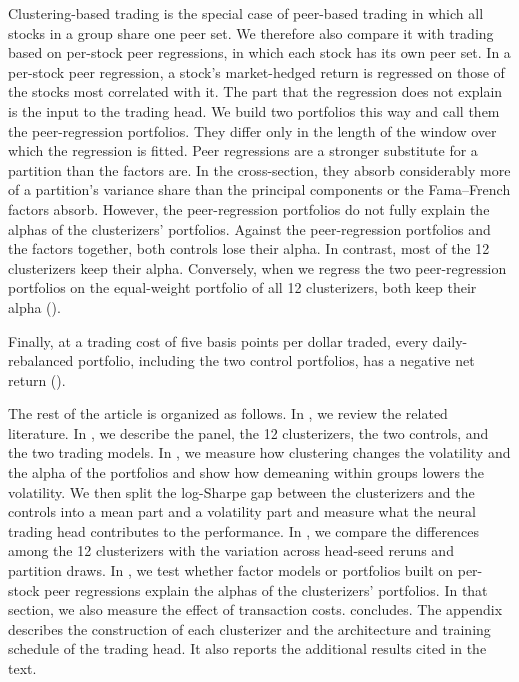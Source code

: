 Clustering-based trading is the special case of peer-based trading in which all stocks in a group share one peer set. We therefore also compare it with trading based on per-stock peer regressions, in which each stock has its own peer set. In a per-stock peer regression, a stock's market-hedged return is regressed on those of the stocks most correlated with it. The part that the regression does not explain is the input to the trading head. We build two portfolios this way and call them the peer-regression portfolios. They differ only in the length of the window over which the regression is fitted. Peer regressions are a stronger substitute for a partition than the factors are.
In the cross-section, they absorb considerably more of a partition's variance share than the principal components or the Fama--French factors absorb. However, the peer-regression portfolios do not fully explain the alphas of the clusterizers' portfolios. Against the peer-regression portfolios and the factors together, both controls lose their alpha. In contrast, most of the 12 clusterizers keep their alpha. Conversely, when we regress the two peer-regression portfolios on the equal-weight portfolio of all 12 clusterizers, both keep their alpha ().

Finally, at a trading cost of five basis points per dollar traded, every daily-rebalanced portfolio, including the two control portfolios, has a negative net return ().

The rest of the article is organized as follows. In , we review the related literature. In , we describe the panel, the 12 clusterizers, the two controls, and the two trading models. In , we measure how clustering changes the volatility and the alpha of the portfolios and show how demeaning within groups lowers the volatility. We then split the log-Sharpe gap between the clusterizers and the controls into a mean part and a volatility part and measure what the neural trading head contributes to the performance. In , we compare the differences among the 12 clusterizers with the variation across head-seed reruns and partition draws. In , we test whether factor models or portfolios built on per-stock peer regressions explain the alphas of the clusterizers' portfolios. In that section, we also measure the effect of transaction costs.  concludes. The appendix describes the construction of each clusterizer and the architecture and training schedule of the trading head. It also reports the additional results cited in the text.
